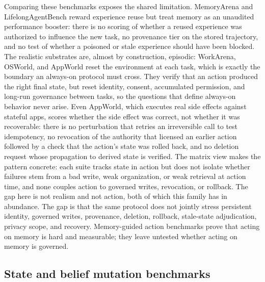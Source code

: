 Comparing these benchmarks exposes the shared limitation. MemoryArena and LifelongAgentBench reward experience reuse but treat memory as an unaudited performance booster: there is no scoring of whether a reused experience was authorized to influence the new task, no provenance tier on the stored trajectory, and no test of whether a poisoned or stale experience should have been blocked. The realistic substrates are, almost by construction, episodic: WorkArena, OSWorld, and AppWorld reset the environment at each task, which is exactly the boundary an always-on protocol must cross. They verify that an action produced the right final state, but reset identity, consent, accumulated permission, and long-run governance between tasks, so the questions that define always-on behavior never arise. Even AppWorld, which executes real side effects against stateful apps, scores whether the side effect was correct, not whether it was recoverable: there is no perturbation that retries an irreversible call to test idempotency, no revocation of the authority that licensed an earlier action followed by a check that the action's state was rolled back, and no deletion request whose propagation to derived state is verified. The matrix view makes the pattern concrete: each suite tracks state in action but does not isolate whether failures stem from a bad write, weak organization, or weak retrieval at action time, and none couples action to governed writes, revocation, or rollback. The gap here is not realism and not action, both of which this family has in abundance. The gap is that the same protocol does not jointly stress persistent identity, governed writes, provenance, deletion, rollback, stale-state adjudication, privacy scope, and recovery. Memory-guided action benchmarks prove that acting on memory is hard and measurable; they leave untested whether acting on memory is governed.

\subsection{State and belief mutation benchmarks}

